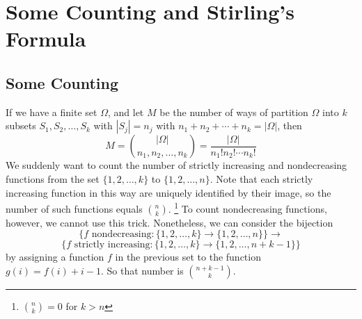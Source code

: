 \section{Some Counting and Stirling's Formula}
\subsection{Some Counting}
If we have a finite set $\Omega$, and let $M$ be the number of ways of partition $\Omega$ into $k$ subsets $S_1,S_2,\ldots,S_k$ with $|S_j|=n_j$ with $n_1+n_2+\cdots +n_k=|\Omega|$, then
$$M=\binom{|\Omega|}{n_1,n_2,\ldots,n_k}=\frac{|\Omega|}{n_1!n_2!\cdots n_k!}$$
We suddenly want to count the number of strictly increasing and nondecreasing functions from the set $\{1,2,\ldots,k\}$ to $\{1,2,\ldots,n\}$.
Note that each strictly increasing function in this way are uniquely identified by their image, so the number of such functions equals $\binom{n}{k}$.
\footnote{$\binom{n}{k}=0$ for $k>n$}
To count nondecreasing functions, however, we cannot use this trick.
Nonetheless, we can consider the bijection
$$\{f\text{ nondecreasing}:\{1,2,\ldots,k\}\to\{1,2,\ldots,n\}\}\to$$
$$\{f\text{ strictly increasing}:\{1,2,\ldots,k\}\to\{1,2,\ldots,n+k-1\}\}$$
by assigning a function $f$ in the previous set to the function $g(i)=f(i)+i-1$.
So that number is $\binom{n+k-1}{k}$.
